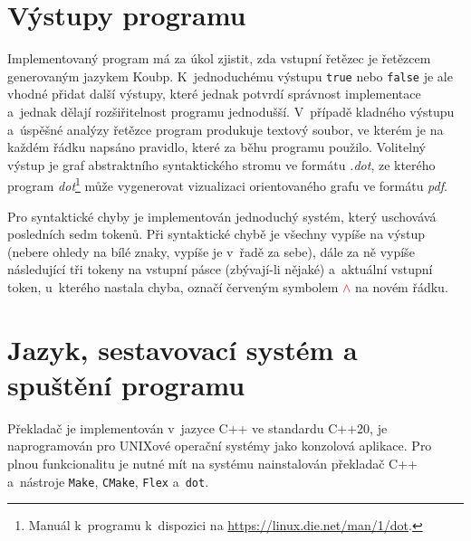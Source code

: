 \section{Výstupy programu}
Implementovaný program má za úkol zjistit, zda vstupní řetězec je řetězcem generovaným jazykem Koubp.
K~jednoduchému výstupu \texttt{true} nebo \texttt{false} je ale vhodné přidat další výstupy, které jednak potvrdí správnost implementace a~jednak dělají rozšiřitelnost programu jednodušší.
V~případě kladného výstupu a~úspěšné analýzy řetězce program produkuje textový soubor, ve kterém je na každém řádku napsáno pravidlo, které za běhu programu použilo.
Volitelný výstup je graf abstraktního syntaktického stromu ve formátu \emph{.dot}, ze kterého program \emph{dot}\footnote{Manuál k~programu k~dispozici na \href{https://linux.die.net/man/1/dot}{https://linux.die.net/man/1/dot}.} může vygenerovat vizualizaci orientovaného grafu ve formátu \emph{pdf}.

Pro syntaktické chyby je implementován jednoduchý systém, který uschovává posledních sedm tokenů.
Při syntaktické chybě je všechny vypíše na výstup (nebere ohledy na bílé znaky, vypíše je v~řadě za sebe), dále za ně vypíše následující tři tokeny na vstupní pásce (zbývají-li nějaké) a~aktuální vstupní token, u~kterého nastala chyba, označí červeným symbolem \textcolor{red}{$\wedge$} na novém řádku.

\section{Jazyk, sestavovací systém a spuštění programu}
Překladač je implementován v~jazyce C++ ve standardu C++20, je naprogramován pro UNIXové operační systémy jako konzolová aplikace. 
Pro plnou funkcionalitu je nutné mít na systému nainstalován překladač C++ a~nástroje \texttt{Make}, \texttt{CMake}, \texttt{Flex} a~\texttt{dot}.

